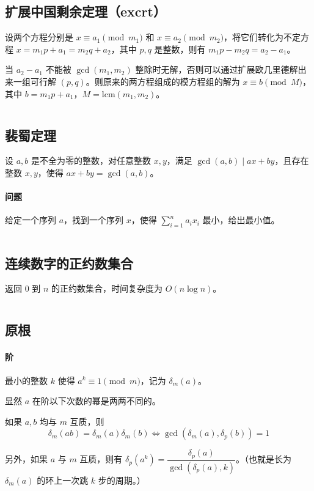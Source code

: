 \documentclass[a4paper, twoside]{article}
\begin{document}
\subsection{扩展中国剩余定理（excrt）}
设两个方程分别是 $x\equiv a_1 \pmod {m_1}$ 和 $x\equiv a_2 \pmod {m_2}$，将它们转化为不定方程 $x = m_1 p + a_1 = m_2 q + a_2$，其中 $p, q$ 是整数，则有 $m_1 p - m_2 q = a_2 - a_1$。

当 $a_2 - a_1$ 不能被 $\gcd(m_1, m_2)$ 整除时无解，否则可以通过扩展欧几里德解出来一组可行解 $(p, q)$。则原来的两方程组成的模方程组的解为 $x\equiv b\pmod M$，其中 $b = m_1 p + a_1$，$M = \text{lcm}(m_1, m_2)$。
\inputminted{cpp}{../src/数论/扩展中国剩余定理（excrt）.cpp}

\subsection{裴蜀定理}
设 $a, b$ 是不全为零的整数，对任意整数 $x, y$，满足 $\gcd(a,b) \mid ax + by$，且存在整数 $x,y$，使得 $ax+by = \gcd(a,b)$。

\paragraph{问题} 给定一个序列 $a$，找到一个序列 $x$，使得 $\sum\limits_{i=1}^{n}a_{i}x_{i}$ 最小，给出最小值。
\inputminted{cpp}{../src/数论/裴蜀定理.cpp}

\subsection{连续数字的正约数集合}
返回 $0$ 到 $n$ 的正约数集合，时间复杂度为 $O(n \log n)$。
\inputminted{cpp}{../src/数论/连续数字的正约数集合.cpp}

\subsection{原根}
\paragraph{阶} 最小的整数 $k$ 使得 $a ^ k \equiv 1 \pmod m$，记为 $\delta_m(a)$。

显然 $a$ 在阶以下次数的幂是两两不同的。

如果 $a, b$ 均与 $m$ 互质，则
$$\delta_m(ab)=\delta_m(a)\delta_m(b) \iff \gcd\left(\delta_m(a),\delta_p(b)\right) = 1$$

另外，如果 $a$ 与 $m$ 互质，则有 $\delta_p(a^k)=\dfrac{\delta_p(a)}{\gcd\left(\delta_p(a),k\right)}$。（也就是长为 $\delta_m(a)$ 的环上一次跳 $k$ 步的周期。）
\end{document}

